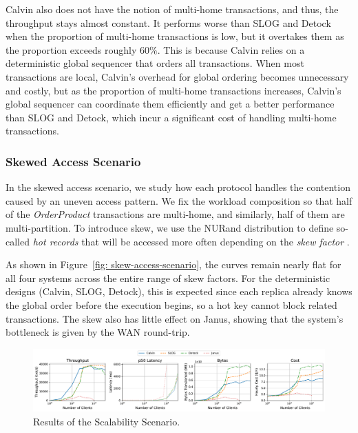 Calvin also does not have the notion of multi-home transactions, and thus, the throughput stays almost constant. It performs worse than SLOG and Detock when the proportion of multi-home transactions is low, but it overtakes them as the proportion exceeds roughly $60\%$. This is because Calvin relies on a deterministic global sequencer that orders all transactions. When most transactions are local, Calvin's overhead for global ordering becomes unnecessary and costly, but as the proportion of multi-home transactions increases, Calvin's global sequencer can coordinate them efficiently and get a better performance than SLOG and Detock, which incur a significant cost of handling multi-home transactions.

\subsubsection{Skewed Access Scenario}
\label{subsubsec: skew-access-scenario}
In the skewed access scenario, we study how each protocol handles the contention caused by an uneven access pattern. We fix the workload composition so that half of the \textit{OrderProduct} transactions are multi-home, and similarly, half of them are multi-partition. To introduce skew, we use the NURand distribution to define so-called \textit{hot records} that will be accessed more often depending on the \textit{skew factor} \cite{council2010tpc}.

As shown in Figure~\ref{fig: skew-access-scenario}, the curves remain nearly flat for all four systems across the entire range of skew factors. For the deterministic designs (Calvin, SLOG, Detock), this is expected since each replica already knows the global order before the execution begins, so a hot key cannot block related transactions. The skew also has little effect on Janus, showing that the system's bottleneck is given by the WAN round-trip.

\begin{figure}[ht]
    \centering
    \includegraphics[width=1\textwidth]{figures/Scalability.pdf}
    \caption{Results of the Scalability Scenario.}
    \label{fig: scalability-access-scenario}
\end{figure}

